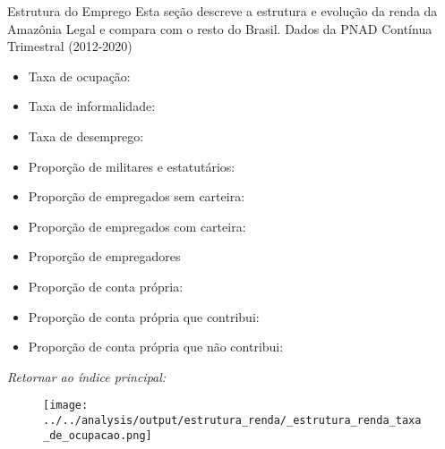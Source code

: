 \begin{frame}[label=_estrutura_renda]{Estrutura do Emprego}
Esta seção descreve a estrutura e evolução da renda da Amazônia Legal e compara com o resto do Brasil. Dados da PNAD Contínua Trimestral (2012-2020)
\begin{footnotesize}
\begin{itemize}
\item{Taxa de ocupação: \hyperlink{_estrutura_renda_taxa_de_ocupacao}{}}
\item{Taxa de informalidade: \hyperlink{_estrutura_renda_taxa_de_informalidade}{}}
\item{Taxa de desemprego: \hyperlink{_estrutura_renda_taxa_de_desemprego}{}}
\item{Proporção de militares e estatutários: \hyperlink{_estrutura_renda_prop_militar}{}}
\item{Proporção de empregados sem carteira: \hyperlink{_estrutura_renda_prop_empregadoSC}{}}
\item{Proporção de empregados com carteira: \hyperlink{_estrutura_renda_prop_empregadoCC}{}}
\item{Proporção de empregadores \hyperlink{_estrutura_renda_prop_empregador}{}}
\item{Proporção de conta própria: \hyperlink{_estrutura_renda_prop_cpropria}{}}
\item{Proporção de conta própria que contribui: \hyperlink{_estrutura_renda_prop_cpropriaC}{}}
\item{Proporção de conta própria que não contribui: \hyperlink{_estrutura_renda_prop_cpropriaNc}{}}
\end{itemize}
\end{footnotesize}

\begin{small}
\textit{Retornar ao índice principal: \hyperlink{indice_principal}{} }
\end{small}

\end{frame}

\begin{frame}[label=_estrutura_renda_taxa_de_ocupacao]{}
\textit{\hyperlink{_estrutura_renda}{}}
\begin{figure}
  \centering
  \texttt{[image: ../../analysis/output/estrutura\_renda/\_estrutura\_renda\_taxa\_de\_ocupacao.png]}
  \caption{}
  \label{fig:_estrutura_renda_taxa_de_ocupacao}
\end{figure}
\end{frame}


